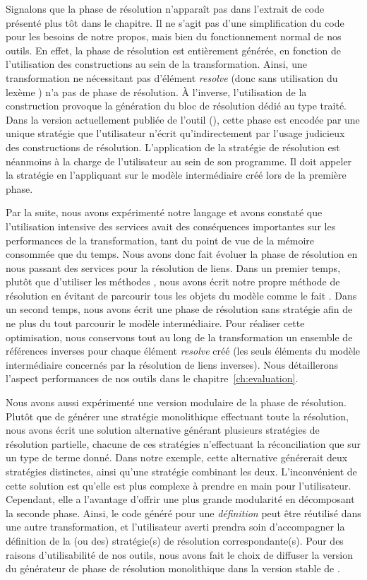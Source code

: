 Signalons que la phase de résolution n'apparaît pas dans l'extrait de
code présenté plus tôt dans le chapitre. Il ne s'agit pas d'une simplification
du code pour les besoins de notre propos, mais bien du fonctionnement normal de
nos outils. En effet, la phase de résolution est entièrement générée, en
fonction de l'utilisation des constructions  au sein de la
transformation.  Ainsi, une transformation ne nécessitant pas d'élément
\emph{resolve} (donc sans utilisation du lexème ) n'a pas de
phase de résolution.
À l'inverse, l'utilisation de la construction provoque la génération du bloc de
résolution dédié au type traité. Dans la version actuellement publiée de
l'outil ({}), cette phase est encodée par une unique stratégie que
l'utilisateur n'écrit qu'indirectement par l'usage judicieux des constructions
de résolution. L'application de la stratégie de résolution est néanmoins à la
charge de l'utilisateur au sein de son programme.  Il doit appeler la stratégie
en l'appliquant sur le modèle intermédiaire créé lors de la première phase.

Par la suite, nous avons expérimenté notre langage et avons constaté que
l'utilisation intensive des services {\emf} avait des conséquences importantes
sur les performances de la transformation, tant du point de vue de la mémoire
consommée que du temps. Nous avons donc fait évoluer la phase de résolution en
nous passant des services {\emf} pour la résolution de liens. Dans un premier
temps, plutôt que d'utiliser les méthodes {\emf}, nous avons écrit notre propre
méthode de résolution en évitant de parcourir tous les objets du modèle comme
le fait {\emf}. Dans un second temps, nous avons écrit une phase de résolution
sans stratégie afin de ne plus du tout parcourir le modèle intermédiaire. Pour
réaliser cette optimisation, nous conservons tout au long de la transformation
un ensemble de références inverses pour chaque élément \emph{resolve} créé (les
seuls éléments du modèle intermédiaire concernés par la résolution de liens
inverses). Nous détaillerons l'aspect performances de nos outils dans le
chapitre~\ref{ch:evaluation}.

Nous avons aussi expérimenté une version modulaire de la phase de résolution.
Plutôt que de générer une stratégie monolithique effectuant toute la
résolution, nous avons écrit une solution alternative générant plusieurs
stratégies de résolution partielle, chacune de ces stratégies n'effectuant la
réconciliation que sur un type de terme donné. Dans notre exemple, cette
alternative générerait deux stratégies distinctes, ainsi qu'une stratégie
combinant les deux. L'inconvénient de cette solution est qu'elle est plus
complexe à prendre en main pour l'utilisateur. Cependant, elle a l'avantage
d'offrir une plus grande modularité en décomposant la seconde phase. Ainsi, le
code généré pour une \emph{définition} peut être réutilisé dans une autre
transformation, et l'utilisateur averti prendra soin d'accompagner la
définition de la (ou des) stratégie(s) de résolution correspondante(s).
Pour des raisons d'utilisabilité de nos outils, nous avons fait le choix de
diffuser la version du générateur de phase de résolution monolithique dans la
version stable de {\tom}.

